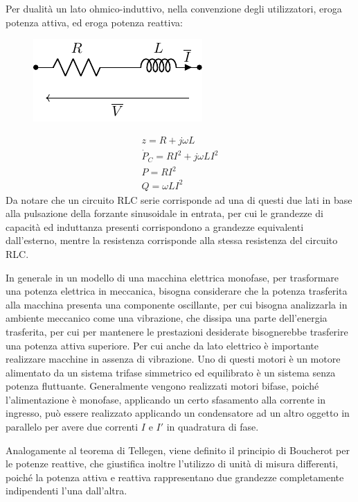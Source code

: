 \documentclass{article}
\numberwithin{equation}{subsection}
\begin{document}
Per dualità un lato ohmico-induttivo, nella convenzione degli utilizzatori, eroga potenza attiva, ed eroga potenza reattiva: 
\begin{figure}[H]%
    \centering
    \includegraphics{rl-serie-fasori.pdf}%
    \label{fig:rl-serie-fasori}
\end{figure}
\begin{gather*}
    z=R+j\omega L\\
    \dot P_C=RI^2+j\omega LI^2\\
    P=RI^2\\
    Q=\omega LI^2
\end{gather*}
Da notare che un circuito RLC serie corrisponde ad una di questi due lati in base alla pulsazione della forzante sinusoidale in entrata, per cui le grandezze di capacità ed 
induttanza presenti corrispondono a grandezze equivalenti dall'esterno, mentre la resistenza corrisponde alla stessa resistenza del circuito RLC. 


In generale in un modello di una macchina elettrica monofase, per trasformare una potenza elettrica in meccanica, bisogna considerare che la potenza trasferita alla macchina 
presenta una componente oscillante, per cui bisogna analizzarla in ambiente meccanico come una vibrazione, che dissipa una parte dell'energia trasferita, per cui 
per mantenere le prestazioni desiderate bisognerebbe trasferire una potenza attiva superiore. Per cui anche da lato elettrico è importante realizzare macchine in assenza di 
vibrazione. Uno di questi motori è un motore alimentato da un sistema trifase simmetrico ed equilibrato è un sistema senza potenza fluttuante. Generalmente vengono realizzati 
motori bifase, poiché l'alimentazione è monofase, applicando un certo sfasamento alla corrente in ingresso, può essere realizzato applicando un condensatore ad un altro oggetto 
in parallelo per avere due correnti $I$ e $I'$ in quadratura di fase. 

Analogamente al teorema di Tellegen, viene definito il principio di Boucherot per le potenze reattive, che giustifica inoltre l'utilizzo di unità di misura 
differenti, poiché la potenza attiva e reattiva rappresentano due grandezze completamente indipendenti l'una dall'altra.  
\end{document}
